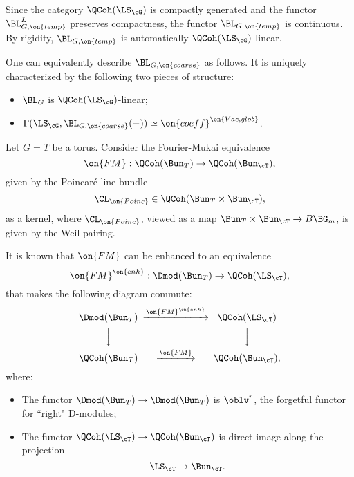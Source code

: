\documentclass[9pt]{amsart}
\theoremstyle{remark}
\theoremstyle{definition}
\theoremstyle{remark}
\numberwithin{equation}{section}
\begin{document}
\medskip 

Since the category $\QCoh(\LS_\cG)$ is compactly generated and the functor $\BL^L_{G,\on{temp}}$ preserves compactness, 
the functor $\BL_{G,\on{temp}}$ is continuous. 
By rigidity, $\BL_{G,\on{temp}}$ is automatically $\QCoh(\LS_\cG)$-linear. 

\sssec{}

One can equivalently describe $\BL_{G,\on{coarse}}$ as follows. It is uniquely characterized by the following
two pieces of structure: 

\begin{itemize}

\item $\BL_G$ is $\QCoh(\LS_\cG)$-linear;

\smallskip

\item $\Gamma(\LS_\cG,\BL_{G,\on{coarse}}(-))\simeq \on{coeff}^{\on{Vac,glob}}$.

\end{itemize} 

 \label{ss:torus case}

\sssec{}

Let $G=T$ be a torus. Consider the Fourier-Mukai equivalence
$$\on{FM}:\QCoh(\Bun_T)\to \QCoh(\Bun_\cT),$$
given by the Poincar\'e line bundle 
$$\CL_{\on{Poinc}}\in \QCoh(\Bun_T\times \Bun_\cT),$$
as a kernel, where $\CL_{\on{Poinc}}$, viewed as a map $\Bun_T\times \Bun_\cT\to B\BG_m$, is
given by the Weil pairing.

\sssec{}

It is known that $\on{FM}$ can be enhanced to an equivalence
$$\on{FM}^{\on{enh}}:\Dmod(\Bun_T)\to \QCoh(\LS_\cT),$$
that makes the following diagram commute:
$$
\CD
\Dmod(\Bun_T) @>{\on{FM}^{\on{enh}}}>> \QCoh(\LS_\cT) \\
@VVV @VVV \\
\QCoh(\Bun_T) @>{\on{FM}}>> \QCoh(\Bun_\cT),
\endCD
$$
where: 

\begin{itemize}

\item The functor $\Dmod(\Bun_T)\to \Dmod(\Bun_T)$ is $\oblv^r$, the forgetful functor for ``right" D-modules;

\medskip

\item The functor $\QCoh(\LS_\cT)\to \QCoh(\Bun_\cT)$ is direct image along the projection
$$\LS_\cT\to \Bun_\cT.$$

\end{itemize}
\end{document}
